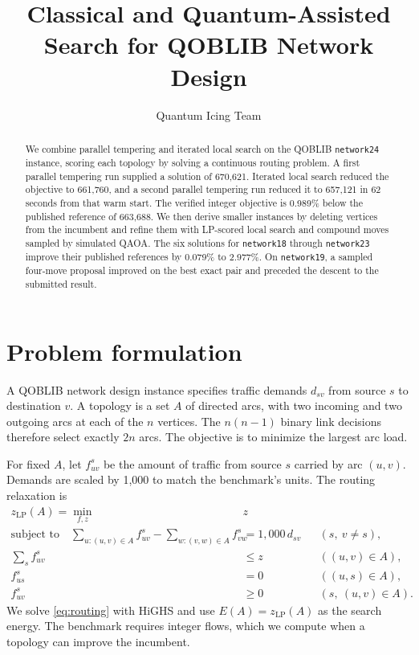 \documentclass[a4paper]{article}
\title{Classical and Quantum-Assisted Search for QOBLIB Network Design}
\author{Quantum Icing Team}
\date{}
\begin{document}
\maketitle

\begin{abstract}
We combine parallel tempering and iterated local search on the QOBLIB \texttt{network24} instance, scoring each topology
by solving a continuous routing problem. A first parallel tempering run supplied a solution of 670,621.
Iterated local search reduced the objective to 661,760, and a second parallel tempering run reduced it to 657,121
in 62 seconds from that warm start. The verified integer objective is 0.989\% below the published reference of 663,688.
We then derive smaller instances by deleting vertices from the incumbent and refine them with LP-scored local search
and compound moves sampled by simulated QAOA. The six solutions for \texttt{network18} through \texttt{network23}
improve their published references by 0.079\% to 2.977\%. On \texttt{network19}, a sampled four-move proposal
improved on the best exact pair and preceded the descent to the submitted result.
\end{abstract}

\section{Problem formulation}

A QOBLIB network design instance specifies traffic demands \(d_{sv}\) from source \(s\) to destination \(v\).
A topology is a set \(A\) of directed arcs, with two incoming and two outgoing arcs at each of the \(n\) vertices.
The \(n(n-1)\) binary link decisions therefore select exactly \(2n\) arcs. The objective is to minimize the largest arc load.

For fixed \(A\), let \(f^s_{uv}\) be the amount of traffic from source \(s\) carried by arc \((u,v)\).
Demands are scaled by 1,000 to match the benchmark's units. The routing relaxation is
\begin{equation}
\label{eq:routing}
\begin{aligned}
z_{\mathrm{LP}}(A) = \min_{f,z}\;& z\\
\text{subject to}\quad
\sum_{u:(u,v)\in A} f^s_{uv} - \sum_{w:(v,w)\in A} f^s_{vw}
  &= 1{,}000\,d_{sv} && (s,\ v\ne s),\\
\sum_s f^s_{uv} &\le z && ((u,v)\in A),\\
f^s_{us}&=0 && ((u,s)\in A),\\
f^s_{uv}&\ge 0 && (s,\ (u,v)\in A).
\end{aligned}
\end{equation}
We solve \eqref{eq:routing} with HiGHS and use \(E(A)=z_{\mathrm{LP}}(A)\) as the search energy.
The benchmark requires integer flows, which we compute when a topology can improve the incumbent.
\end{document}
